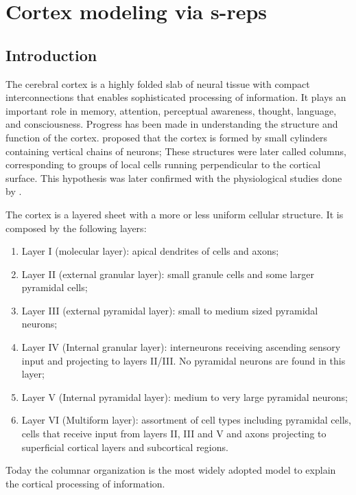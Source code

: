
\graphicspath{{ChapterCortex/images/}}
\chapter{Cortex modeling via s-reps}
\label{chapter:cortexModeling}

\section{Introduction}
\label{sec:Introduction}

The cerebral cortex is a highly folded slab of neural tissue 
with compact interconnections that enables sophisticated processing of information.
It plays an important role in memory, attention, perceptual awareness, thought, language, and consciousness.
Progress has been made in understanding the structure and function of the cortex.
\cite{lorente1934studies} proposed that the cortex is formed by small cylinders containing vertical chains of neurons; 
These structures were later called columns, corresponding to groups of local cells running perpendicular to the cortical surface.
This hypothesis was later confirmed with the physiological studies done by \cite{mountcastle1998perceptual}. 

The cortex is a layered sheet with a more or less uniform cellular structure. 
It is composed by the following layers:
\begin{enumerate}
 \item Layer I (molecular layer): apical dendrites of cells and axons; 
 \item Layer II (external granular layer): small granule cells and some larger pyramidal cells;
 \item Layer III (external pyramidal layer): small to medium sized pyramidal neurons;
 \item Layer IV (Internal granular layer): interneurons receiving ascending sensory input and projecting to layers II/III. No pyramidal neurons are found in this layer;
 \item Layer V (Internal pyramidal layer): medium to very large pyramidal neurons; 
 \item Layer VI (Multiform layer): assortment of cell types including pyramidal cells, cells that receive input from layers II, III and V and 
       axons projecting to superficial cortical layers and subcortical regions.
\end{enumerate}
Today the columnar organization is the most widely adopted model to explain the cortical processing of information.

